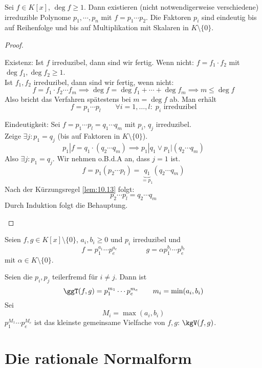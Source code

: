 \documentclass{mycourse}
\begin{document}
\begin{thm}
\label{thm:12.5}
Sei $f\in K[x]$, $\deg f\ge 1$.
Dann existieren (nicht notwendigerweise verschiedene) irreduzible Polynome $p_1,\cdots,p_n$ mit
$f=p_1\cdots p_2$.
Die Faktoren $p_i$ sind eindeutig bis auf Reihenfolge und bis auf Multiplikation mit Skalaren in $K\setminus \{0\}$.

\begin{proof}
	\begin{seg}{Existenz:}
Ist $f$ irreduzibel, dann sind wir fertig.
Wenn nicht: $f=f_1\cdot f_2$ mit $\deg f_1,\deg f_2 \ge 1$.\\
Ist $f_1, f_2$ irreduzibel, dann sind wir fertig, wenn nicht:\\
\[
f=f_1\cdot f_2\cdots f_m \implies \deg f=\deg f_1 + \dotsb + \deg f_m \implies m\le \deg f
\]
Also bricht das Verfahren spätestens bei $m=\deg f$ ab.
Man erhält
\[
	f=p_1\dotsb p_l \qquad \forall i=1,\dotsc,l :\; p_i \text{ irreduzibel}
\]
\end{seg}

\begin{seg}{Eindeutigkeit:}
Sei $f=p_1\dotsb p_l=q_1\dotsb q_m$ mit $p_i$, $q_j$ irreduzibel.
\\Zeige $\exists j:p_1=q_j$ (bis auf Faktoren in $K \setminus \{0\}$).
\[
p_1|f = q_1\cdot (q_2\dotsb q_m) \implies p_1|q_1 \lor p_1|(q_2\dotsb q_m)
\]
Also $\exists j:p_1=q_j$.
Wir nehmen o.B.d.A an, dass $j=1$ ist.
\[
f=p_1(p_2\dotsb p_l) = \underbrace{q_1}_{=p_1}(q_2\dotsb q_m)
\]
Nach der Kürzungsregel \ref{lem:10.13} folgt:
\[
p_2\dotsb p_l = q_2 \dotsb q_m
\]
Durch Induktion folgt die Behauptung.
\end{seg}
\end{proof}
\end{thm}

Seien $f,g\in K[x]\setminus \{0\}$, $a_i,b_i\ge 0$ und $p_i$ irreduzibel und
\[
	f=p_1^{a_1} \dotsb p_e^{a_e} \qquad\qquad g=\alpha p_1^{b_1}\dotsb p_e^{b_e}
\]
mit $\alpha \in K\setminus \{0\}$.

Seien die $p_i,p_j$ teilerfremd für $i\neq j$.
Dann ist
\[
\ggT(f,g) = p_1^{m_1}\dotsb p_e^{m_e} \qquad {m_i=\min(a_i,b_i)}
\]
Sei
\[
M_i =\max(a_i,b_i)
\]
$p_1^{M_1}\dotsb p_e^{M_e}$ ist das kleinste gemeinsame Vielfache von $f,g$: $\kgV(f,g)$.


\section{Die rationale Normalform}
\end{document}
